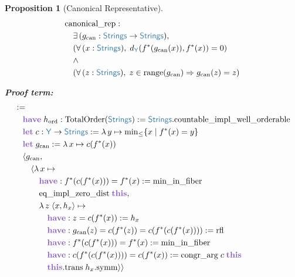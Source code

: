 \documentclass[11pt]{article}
\theoremstyle{definition}
\theoremstyle{plain}
\newtheorem{propenv}{Proposition}
\newcommand{\kw}[1]{\textcolor{keyword}{\textbf{#1}}}
\newcommand{\ty}[1]{\textcolor{type}{\mathsf{#1}}}
\newcommand{\fn}[1]{\mathrm{#1}}
\newcommand{\lam}{\lambda\,}
\newcommand{\all}{\forall\,}
\newcommand{\ex}{\exists\,}
\newcommand{\arr}{\to}
\newcommand{\Arr}{\Rightarrow}
\newcommand{\pf}{:=\;}
\newcommand{\Strings}{\ty{Strings}}
\newcommand{\Y}{\ty{Y}}
\newcommand{\fstar}{f^*}
\newcommand{\dY}{d_{\Y}}
\begin{document}
\begin{propenv}[Canonical Representative]
\label{prop:canonical}
\begin{align*}
&\fn{canonical\_rep} : \\
&\quad \ex (g_{\text{can}} : \Strings \arr \Strings), \\
&\quad (\all (x : \Strings),\; \dY(\fstar(g_{\text{can}}(x)), \fstar(x)) = 0) \\
&\quad \land \\
&\quad (\all (z : \Strings),\; z \in \fn{range}(g_{\text{can}}) \Arr g_{\text{can}}(z) = z)
\end{align*}

\textbf{Proof term:}
\begin{align*}
&\pf \\
&\quad \kw{have}\; h_{\text{ord}} : \fn{TotalOrder}(\Strings) := \Strings.\fn{countable\_impl\_well\_orderable} \\
&\quad \kw{let}\; c : \Y \arr \Strings := \lam y \mapsto \fn{min}_{\leq}\{x \mid \fstar(x) = y\} \\
&\quad \kw{let}\; g_{\text{can}} := \lam x \mapsto c(\fstar(x)) \\
&\quad \langle g_{\text{can}}, \\
&\quad\quad \langle \lam x \mapsto \\
&\quad\quad\quad \kw{have} : \fstar(c(\fstar(x))) = \fstar(x) := \fn{min\_in\_fiber} \\
&\quad\quad\quad \fn{eq\_impl\_zero\_dist}\; \kw{this}, \\
&\quad\quad\quad \lam z\; \langle x, h_x \rangle \mapsto \\
&\quad\quad\quad\quad \kw{have} : z = c(\fstar(x)) := h_x \\
&\quad\quad\quad\quad \kw{have} : g_{\text{can}}(z) = c(\fstar(z)) = c(\fstar(c(\fstar(x)))) := \fn{rfl} \\
&\quad\quad\quad\quad \kw{have} : \fstar(c(\fstar(x))) = \fstar(x) := \fn{min\_in\_fiber} \\
&\quad\quad\quad\quad \kw{have} : c(\fstar(c(\fstar(x)))) = c(\fstar(x)) := \fn{congr\_arg}\; c\; \kw{this} \\
&\quad\quad\quad\quad \kw{this}.\fn{trans}\; h_x.\fn{symm} \rangle \rangle
\end{align*}
\end{propenv}
\end{document}

